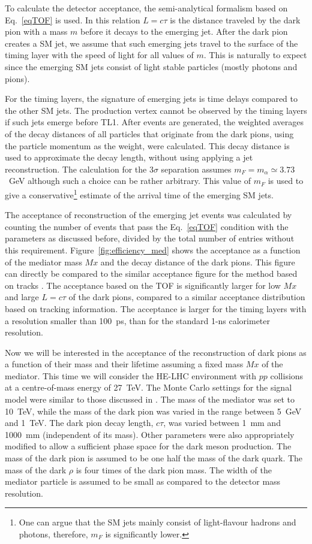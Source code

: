 To calculate the detector acceptance, the semi-analytical formalism based on Eq.~\ref{eqTOF} is used. In this relation $L=c\tau$ is the distance traveled
by the dark pion with a mass $m$ before it decays to the emerging jet.  
After the dark pion creates a SM jet, we assume that
such emerging jets travel to the surface of the timing layer with the speed of light for all values of $m$.
This is naturally to expect since the emerging SM jets consist of light stable particles (mostly photons and pions).
  
For the timing layers, the signature of emerging jets is time delays compared to the other SM jets. The  production vertex
cannot be observed by the timing layers if such jets emerge before TL1.
After events are generated, the weighted averages of the decay distances of all particles that originate from
the dark pions, using the particle momentum as the weight, were  calculated. This decay distance is used
to approximate the decay length, without using applying a jet reconstruction.  
The  calculation for the $3\sigma$ separation assumes $m_F=m_{\alpha}\simeq 3.73$~GeV although such a choice can be rather arbitrary.
This value of $m_F$ is used to give a conservative\footnote{One can argue that the SM jets mainly consist of light-flavour hadrons and photons, 
therefore, $m_F$ is significantly lower.} estimate of the arrival time of the emerging SM jets.

The acceptance of reconstruction of the emerging jet events was calculated by counting the number of events that pass the 
Eq.~\ref{eqTOF} condition  with the parameters as discussed before, divided by the total number of entries
without this requirement. Figure~\ref{fig:efficiency_med} shows the acceptance as a function of the mediator mass $Mx$ and the decay distance
of the dark pions. This figure can directly be compared to the similar acceptance figure for the method based on tracks  \cite{Sirunyan:2018njd}. 
The acceptance based on the TOF is significantly larger for low $Mx$ and large $L=c\tau$ of the dark pions, compared to a
similar acceptance distribution based on tracking information.  
The acceptance is larger for the timing layers with a resolution smaller than 100~ps, than for the standard 1-ns calorimeter resolution. 

Now we will be interested in the acceptance  of the reconstruction of dark pions  as a function of their mass
and their lifetime assuming a fixed mass $Mx$ of the mediator. This time we will consider the HE-LHC environment 
with $pp$ collisions at a centre-of-mass energy of 27~TeV.    
The Monte Carlo settings for the signal model were similar
to those discussed in  \cite{Sirunyan:2018njd,prive}.
The mass of the mediator was set to 10~TeV, while the mass of the dark pion was varied in the range between 5~GeV and 1~TeV.
The dark pion decay length, $c\tau$,  was varied between 1~mm and 1000~mm (independent of its mass). Other parameters
were also appropriately modified to allow a sufficient phase space for the dark meson production.
The mass of the dark pion is assumed to be one half the mass of the dark quark. The mass of the dark
$\rho$ is four times of the dark pion mass. The width of the
mediator particle is assumed to be small as compared to the detector mass resolution.

